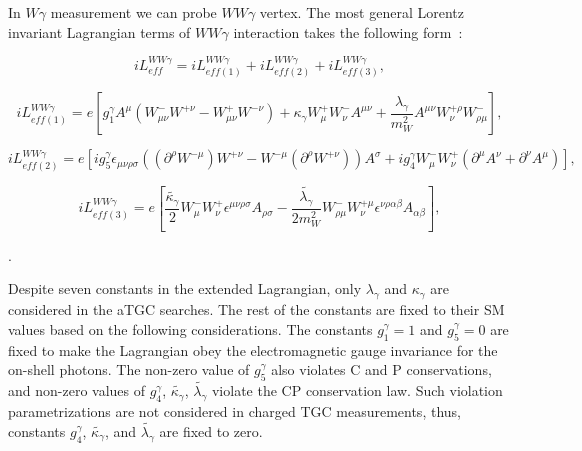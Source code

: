 In $W\gamma$ measurement we can probe $WW\gamma$ vertex. The most general Lorentz invariant Lagrangian terms of $WW\gamma$ interaction takes the following form~\cite{ref_theory_aTGC}:

\begin{equation}\label{L_ATGC}
i L_{eff}^{WW\gamma}= i L_{eff(1)}^{WW\gamma} + i L_{eff(2)}^{WW\gamma} + i L_{eff(3)}^{WW\gamma},
\end{equation}


\begin{equation}\label{L_ATGC_1}
i L_{eff(1)}^{WW\gamma}= e [ g_1^{\gamma} A^\mu (W_{\mu\nu}^- W^{+\nu} - W_{\mu\nu}^+ W^{-\nu}) + \kappa_\gamma W_{\mu}^+ W_{\nu}^- A^{\mu\nu} + {\frac{\lambda_\gamma}{m^2_W}} A^{\mu\nu} W_\nu^{+\rho} W_{\rho\mu}^- ],
\end{equation}

\begin{equation}\label{L_ATGC_2}
i L_{eff(2)}^{WW\gamma}= e [ i g_5^\gamma \epsilon_{\mu\nu\rho\sigma}((\partial^\rho W^{-\mu})W^{+\nu} - W^{-\mu}(\partial^{\rho}W^{+\nu}))A^\sigma + i g_4^\gamma W_\mu^- W_\nu^+ (\partial^\mu A^\nu + \partial^\nu A^\mu) ],
\end{equation}

\begin{equation}\label{L_ATGC_3}
i L_{eff(3)}^{WW\gamma}= e [ \frac{\tilde{\kappa_\gamma}}{2} W_\mu^- W_\nu^+ \epsilon^{\mu\nu\rho\sigma} A_{\rho\sigma} - \frac{\tilde{\lambda_\gamma}}{2 m_W^2} W_{\rho\mu}^- W^{+\mu}_{\nu} \epsilon^{\nu\rho\alpha\beta} A_{\alpha\beta}],
\end{equation}

.

Despite seven constants in the extended Lagrangian, only $\lambda_\gamma$ and $\kappa_\gamma$ are considered in the aTGC searches. The rest of the constants are fixed to their SM values based on the following considerations. The constants $g_1^\gamma=1$ and $g_5^\gamma=0$ are fixed to make the Lagrangian obey the electromagnetic gauge invariance for the on-shell photons. The non-zero value of $g_5^\gamma$ also violates C and P conservations, and non-zero values of $g_4^\gamma$, $\tilde{\kappa_\gamma}$, $\tilde{\lambda_\gamma}$ violate the CP conservation law. Such violation parametrizations are not considered in charged TGC measurements, thus, constants $g_4^\gamma$, $\tilde{\kappa_\gamma}$, and $\tilde{\lambda_\gamma}$ are fixed to zero.

